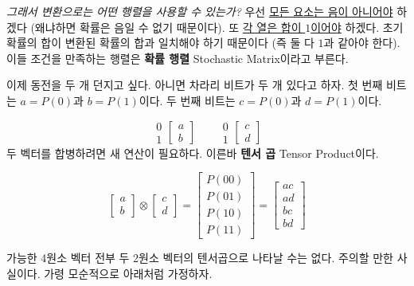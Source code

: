 \documentclass[a4paper,chapter,atbegshi,]{oblivoir}
\begin{document}
\emph{그래서 변환으로는 어떤 행렬을 사용할 수 있는가?} 우선 \underline{모든
요소는 음이 아니어야} 하겠다 (왜냐하면 확률은 음일 수 없기
때문이다). 또 \underline{각 열은 합이 $1$이어야} 하겠다. 초기
확률의 합이 변환된 확률의 합과 일치해야 하기 때문이다 (즉 둘 다
$1$과 같아야 한다). 이들 조건을 만족하는 행렬은 \textbf{확률 행렬}{\footnotesize
Stochastic Matrix}이라고 부른다. 

이제 동전을 두 개 던지고 싶다. 아니면 차라리 비트가 두 개 있다고 하자. 
첫 번째 비트는 $a = P(0)$과 $b = P(1)$이다. 두 번째 비트는 $c = P(0)$과
$d = P(1)$이다.

\[
  \begin{matrix}{\scriptstyle0} \\ {\scriptstyle1} \end{matrix}
  \begin{bmatrix}a \\ b\end{bmatrix}\quad\quad
  \begin{matrix}{\scriptstyle0} \\ {\scriptstyle1} \end{matrix}
  \begin{bmatrix}c \\ d\end{bmatrix}
\]
두 벡터를 합병하려면 새 연산이 필요하다. 이른바 \textbf{텐서 곱}{\footnotesize
Tensor Product}이다.

\begin{equation}
  \begin{bmatrix}a\\b\end{bmatrix} \otimes \begin{bmatrix}c\\d\end{bmatrix} =
  \begin{bmatrix}P(00)\\P(01)\\P(10)\\P(11)\end{bmatrix} = 
  \begin{bmatrix}ac\\ad\\bc\\bd\end{bmatrix}
\end{equation}

가능한 4원소 벡터 전부 두 2원소 벡터의 텐서곱으로 나타날 수는 없다. 주의할
만한 사실이다. 가령 모순적으로 아래처럼 가정하자. 
\end{document}
